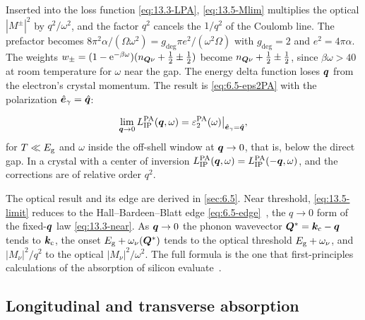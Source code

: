 Inserted into the loss function \cref{eq:13.3-LPA}, \cref{eq:13.5-Mlim} multiplies the optical $|M^\pm|^2$ by $q^2/\omega^2$, and the factor $q^2$ cancels the $1/q^2$ of the Coulomb line. The prefactor becomes $8\pi^2\alpha/(\Omega\omega^2) = g_{\mathrm{deg}}\pi e^2/(\omega^2\Omega)$ with $g_{\mathrm{deg}} = 2$ and $e^2 = 4\pi\alpha$. The weights $w_\pm = (1 - \mathrm{e}^{-\beta\omega})(n_{\bm{Q}\nu} + \frac12 \pm \frac12)$ become $n_{\bm{Q}\nu} + \frac12 \pm \frac12$, since $\beta\omega > 40$ at room temperature for $\omega$ near the gap. The energy delta function loses $\bm{q}$ from the electron's crystal momentum. The result is \cref{eq:6.5-eps2PA} with the polarization $\hat{\bm{e}}_\gamma = \hat{\bm{q}}$:
\begin{keyresult}
\begin{equation}
  \lim_{\bm{q}\to0}L^{\mathrm{PA}}_{\mathrm{IP}}(\bm{q},\omega) = \varepsilon_2^{\mathrm{PA}}(\omega)\big|_{\hat{\bm{e}}_\gamma = \hat{\bm{q}}} ,
  \label{eq:13.5-limit}
\end{equation}
for $T \ll E_{\mathrm{g}}$ and $\omega$ inside the off-shell window at $\bm{q}\to0$, that is, below the direct gap. In a crystal with a center of inversion $L^{\mathrm{PA}}_{\mathrm{IP}}(\bm{q},\omega) = L^{\mathrm{PA}}_{\mathrm{IP}}(-\bm{q},\omega)$, and the corrections are of relative order $q^2$.
\end{keyresult}
\noindent The optical result and its edge are derived in \cref{sec:6.5}. Near threshold, \cref{eq:13.5-limit} reduces to the Hall--Bardeen--Blatt edge \cref{eq:6.5-edge}~\cite{hall1954infrared}, the $q\to0$ form of the fixed-$\bm{q}$ law \cref{eq:13.3-near}. As $\bm{q}\to0$ the phonon wavevector $\bm{Q}^* = \bm{k}_{\mathrm{c}} - \bm{q}$ tends to $\bm{k}_{\mathrm{c}}$, the onset $E_{\mathrm{g}} + \omega_\nu(\bm{Q}^*)$ tends to the optical threshold $E_{\mathrm{g}} + \omega_\nu$, and $|M_\nu|^2/q^2$ to the optical $|M_\nu|^2/\omega^2$. The full formula is the one that first-principles calculations of the absorption of silicon evaluate~\cite[Eq.~(1)]{noffsinger2012phonon}.

\subsection{Longitudinal and transverse absorption}

